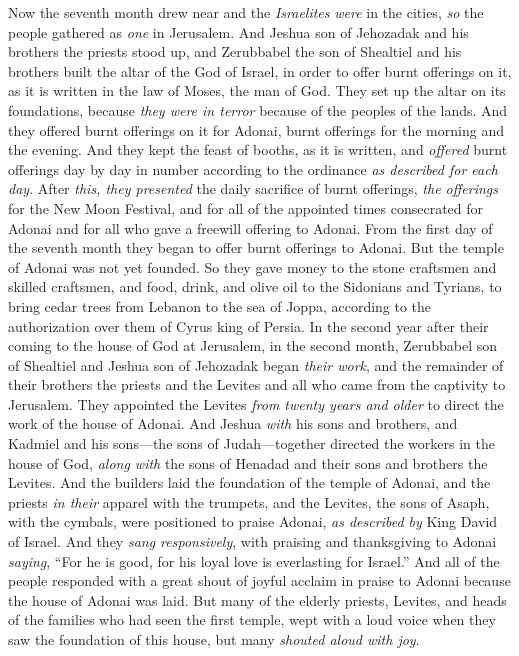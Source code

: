 \begin{biblechapter} %
 Now the seventh month drew near and the \textit{Israelites} \textit{were} in the cities, \textit{so} the people gathered as \textit{one} in Jerusalem.
\verse And Jeshua son of Jehozadak and his brothers the priests stood up, and Zerubbabel the son of Shealtiel and his brothers built the altar of the God of Israel, in order to offer burnt offerings on it, as it is written in the law of Moses, the man of God.
\verse They set up the altar on its foundations, because \textit{they were in terror} because of the peoples of the lands. And they offered burnt offerings on it for Adonai, burnt offerings for the morning and the evening.
\verse And they kept the feast of booths, as it is written, and \textit{offered} burnt offerings day by day in number according to the ordinance \textit{as described for each day}.
\verse After \textit{this, they presented} the daily sacrifice of burnt offerings, \textit{the offerings} for the New Moon Festival, and for all of the appointed times consecrated for Adonai and for all who gave a freewill offering to Adonai.
\verse From the first day of the seventh month they began to offer burnt offerings to Adonai. But the temple of Adonai was not yet founded.
\verse So they gave money to the stone craftsmen and skilled craftsmen, and food, drink, and olive oil to the Sidonians and Tyrians, to bring cedar trees from Lebanon to the sea of Joppa, according to the authorization over them of Cyrus king of Persia.
 In the second year after their coming to the house of God at Jerusalem, in the second month, Zerubbabel son of Shealtiel and Jeshua son of Jehozadak began \textit{their work}, and the remainder of their brothers the priests and the Levites and all who came from the captivity to Jerusalem. They appointed the Levites \textit{from twenty years and older} to direct the work of the house of Adonai.
\verse And Jeshua \textit{with} his sons and brothers, and Kadmiel and his sons—the sons of Judah—together directed the workers in the house of God, \textit{along with} the sons of Henadad and their sons and brothers the Levites.
\verse And the builders laid the foundation of the temple of Adonai, and the priests \textit{in their} apparel with the trumpets, and the Levites, the sons of Asaph, with the cymbals, were positioned to praise Adonai, \textit{as described by} King David of Israel.
\verse And they \textit{sang responsively}, with praising and thanksgiving to Adonai \textit{saying}, “For he is good, for his loyal love is everlasting for Israel.”
\verse And all of the people responded with a great shout of joyful acclaim in praise to Adonai because the house of Adonai was laid.
\verse But many of the elderly priests, Levites, and heads of the families who had seen the first temple, wept with a loud voice when they saw the foundation of this house, but many \textit{shouted aloud with joy}.
\end{biblechapter}

